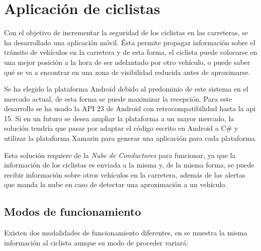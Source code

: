 \section{Aplicación de ciclistas}\label{section:appCiclistas}
Con el objetivo de incrementar la seguridad de los ciclistas en las carreteras, se ha desarrollado una aplicación móvil. Ésta permite propagar información sobre el tránsito de vehículos en la carretera y de esta forma, el ciclista puede colocarse en una mejor posición a la hora de ser adelantado por otro vehículo, o puede saber qué se va a encontrar en una zona de visibilidad reducida antes de
aproximarse.

Se ha elegido la plataforma Android debido al predominio de este sistema en el mercado actual, de esta forma se puede maximizar la recepción. Para este desarrollo se ha usado la API 23 de Android con retrocompatibilidad hasta la \gls{api} 15. Si en un futuro se desea ampliar la plataforma a un mayor mercado, la solución tendría que pasar por adaptar el código escrito en Android a C\# y utilizar la plataforma Xamarin para generar una aplicación para cada plataforma.

Esta solución requiere de la \emph{Nube de Conductores} para funcionar, ya que la información de los ciclistas es enviada a la misma y, de la misma forma, se puede recibir información sobre otros vehículos en la carretera, además de las alertas que manda la nube en caso de detectar una aproximación a un vehículo.

\subsection{Modos de funcionamiento}\label{ssection:commHUB}
Existen dos modalidades de funcionamiento diferentes, en se muestra la misma información al ciclista aunque su modo de proceder variará:


